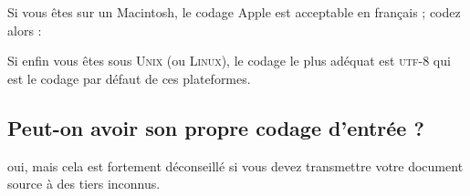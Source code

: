 \documentclass[a4paper,12pt,openright]{article}
\begin{document}
Si vous êtes sur un Macintosh, le codage Apple est acceptable en français ;
codez alors :
\begin{center}
\end{center}
\begin{MAJ}
Si enfin vous êtes sous \textsc{Unix} (ou \textsc{Linux}), le codage le plus adéquat est \textsc{utf-8}
qui est le codage par défaut de ces plateformes.
\end{MAJ}

\subsection{Peut-on avoir son propre codage d'entrée ?}
\label{soncodent}
 oui, mais cela est fortement déconseillé si vous devez transmettre votre
document source à des tiers inconnus.
\end{document}
